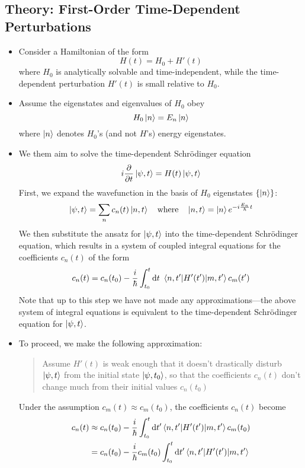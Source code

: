 \documentclass[11pt, a4paper]{article}
\newcommand{\diff}{\mathop{}\!\mathrm{d}} %
\newcommand{\Schro}{Schr\"{o}dinger\xspace}
\newcommand{\Ham}{Hamiltonian\xspace}
\newcommand{\p}{\psi}  %
\begin{document}
\subsection{Theory: First-Order Time-Dependent Perturbations}
\begin{itemize}
	\item Consider a \Ham of the form
	\begin{equation*}
		H(t) = H_{0} + H'(t)
	\end{equation*}
	where $ H_{0} $ is analytically solvable and time-independent, while the time-dependent perturbation $ H'(t) $ is small relative to $ H_{0} $.
	
	\item Assume the eigenstates and eigenvalues of $ H_{0} $ obey
	\begin{equation*}
		H_{0}\ket{n} = E_{n}\ket{n}
	\end{equation*}
	where $ \ket{n} $ denotes $ H_{0} $'s (and not $ H $'s) energy eigenstates.
	
	\item We them aim to solve the time-dependent \Schro equation
	\begin{equation*}
		i \pdv{t} \ket{\p, t} = H(t)\ket{\p, t}
	\end{equation*}
	First, we expand the wavefunction in the basis of $ H_{0} $ eigenstates $ \{\ket{n}\} $:
	\begin{equation*}
		\ket{\p, t} = \sum_{n}c_{n}(t) \ket{n, t} \quad \text{where} \quad \ket{n, t} = \ket{n}e^{-i\frac{E_{n}}{\hbar}t}
	\end{equation*}
	We then substitute the ansatz for $ \ket{\p, t} $ into the time-dependent \Schro equation, which results in a system of coupled integral equations for the coefficients $ c_{n}(t) $ of the form
	\begin{equation*}
		c_{n}(t) = c_{n}(t_{0}) - \frac{i}{\hbar}\int_{t_{0}}^{t}\diff t\ \mel{n, t'}{H'(t')}{m, t'}c_{m}(t')
	\end{equation*}
	Note that up to this step we have not made any approximations---the above system of integral equations is equivalent to the time-dependent \Schro equation for $ \ket{\p, t} $.
	
	\item To proceed, we make the following approximation:
	
	\begin{quote}
		Assume $ H'(t) $ is weak enough that it doesn't drastically disturb $ \ket{\p, t} $ from the initial state $ \ket{\p, t_{0}} $, so that the coefficients $ c_{n}(t) $ don't change much from their initial values $ c_{n}(t_{0}) $
	\end{quote}
	Under the assumption $ c_{m}(t) \approx c_{m}(t_{0}) $, the coefficients $ c_{n}(t) $ become
	\begin{align*}
		c_{n}(t) & \approx c_{n}(t_{0}) - \frac{i}{\hbar}\int_{t_{0}}^{t}\diff t' \mel{n, t'}{H'(t')}{m, t'}c_{m}(t_{0})\\
		& = c_{n}(t_{0}) - \frac{i}{\hbar}c_{m}(t_{0})\int_{t_{0}}^{t}\diff t'  \mel{n, t'}{H'(t')}{m, t'}
	\end{align*}
	

\end{itemize}
\end{document}
